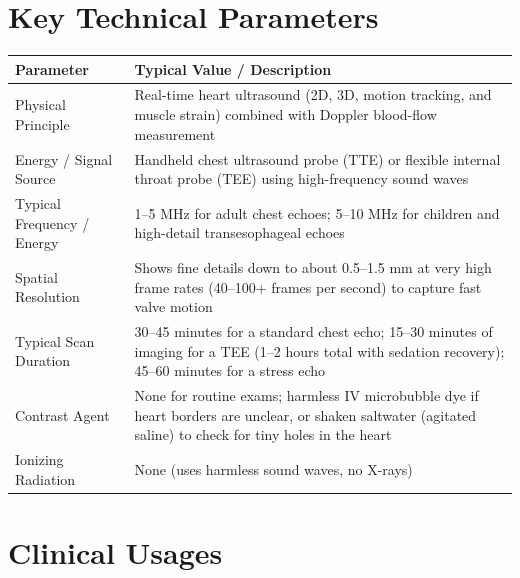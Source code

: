 \section{Key Technical Parameters}
\noindent
\begin{tabularx}{\textwidth}{@{}l X@{}}
\toprule
\textbf{Parameter} & \textbf{Typical Value / Description} \\
\midrule
Physical Principle & Real-time heart ultrasound (2D, 3D, motion tracking, and muscle strain) combined with Doppler blood-flow measurement \\
Energy / Signal Source & Handheld chest ultrasound probe (TTE) or flexible internal throat probe (TEE) using high-frequency sound waves \\
Typical Frequency / Energy & 1--5 MHz for adult chest echoes; 5--10 MHz for children and high-detail transesophageal echoes \\
Spatial Resolution & Shows fine details down to about 0.5--1.5 mm at very high frame rates (40--100+ frames per second) to capture fast valve motion \\
Typical Scan Duration & 30--45 minutes for a standard chest echo; 15--30 minutes of imaging for a TEE (1--2 hours total with sedation recovery); 45--60 minutes for a stress echo \\
Contrast Agent & None for routine exams; harmless IV microbubble dye if heart borders are unclear, or shaken saltwater (agitated saline) to check for tiny holes in the heart \\
Ionizing Radiation & None (uses harmless sound waves, no X-rays) \\
\bottomrule
\end{tabularx}


\section{Clinical Usages}

